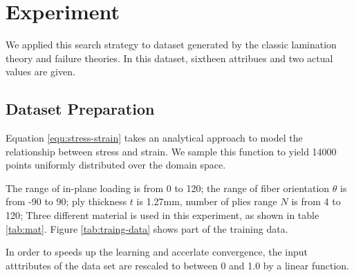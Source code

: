 \section{Experiment}
We applied this search strategy to dataset generated by the classic lamination
theory and failure theories. In this dataset, sixtheen attribues and two actual
values are given.

\subsection{Dataset Preparation}
Equation \ref{equ:stress-strain} takes an analytical approach to model the
relationship between stress and strain. We sample this function to yield 14000 points
uniformly distributed over the domain space.

The range of in-plane loading is from 0 to 120; the range of fiber orientation $\theta$ is from
-90 to 90; ply thickness $t$ is 1.27mm, number of plies range $N$ is from 4 to 120;
Three different material is used in this experiment, as shown in table \ref{tab:mat}.
Figure \ref{tab:traing-data} shows part of the training data.

In order to speeds up the learning and accerlate convergence, the input
atttributes of the data set are rescaled to between 0 and 1.0 by a linear function.




